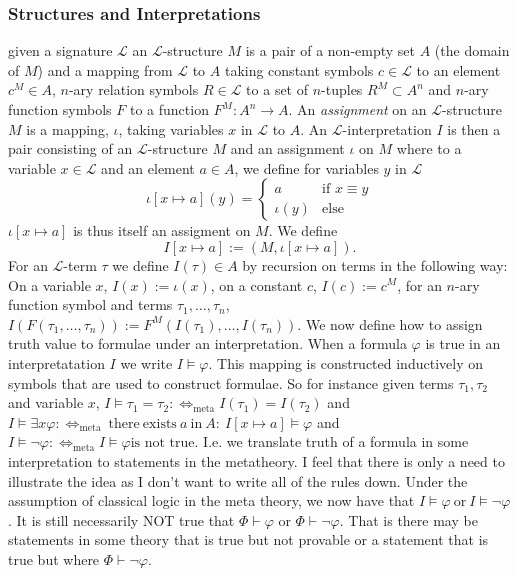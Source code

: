 \subsubsection{Structures and Interpretations}
given a signature $\mathcal{L}$ an $\mathcal{L}$-structure $M$ is a pair of a non-empty set $A$ (the domain of $M$) and a mapping from $\mathcal{L}$ to $A$ taking constant symbols $c\in \mathcal{L}$ to an element $c^M\in A$, $n$-ary relation symbols $R\in \mathcal{L}$ to a set of $n$-tuples $R^M\subset A^n$ and $n$-ary function symbols $F$ to a function $F^M: A^n \rightarrow A$. An \emph{assignment} on an $\mathcal{L}$-structure $M$ is a mapping, $\iota$, taking variables $x$ in $\mathcal{L}$ to $A$. An $\mathcal{L}$-interpretation $I$ is then a pair consisting of an $\mathcal{L}$-structure $M$ and an assignment $\iota$ on $M$ where to a variable $x\in \mathcal{L}$ and an element $a\in A$, we define for variables $y$ in $\mathcal{L}$
$$
    \iota[x\mapsto a] (y)=
    \begin{cases}
        a & \text{if } x\equiv y\\
        \iota(y) & \text{else}
    \end{cases}
$$
$\iota[x\mapsto a]$ is thus itself an assigment on $M$. We define 
$$I[x\mapsto a] := (M,\iota[x\mapsto a]).$$
For an $\mathcal{L}$-term $\tau$ we define $I(\tau)\in A$ by recursion on terms in the following way: On a variable $x$, $I(x):=\iota(x)$, on a constant $c$, $I(c):= c^M$, for an $n$-ary function symbol and terms $\tau_1,\dots,\tau_n$, $I(F(\tau_1,\dots,\tau_n)):= F^M(I(\tau_1),\dots,I(\tau_n)).$ We now define how to assign truth value to formulae under an interpretation. When a formula $\varphi$ is true in an interpretatation $I$ we write $I\vDash \varphi$. This mapping is constructed inductively on symbols that are used to construct formulae. So for instance given terms $\tau_1,\tau_2$ and variable $x$, $I\vDash \tau_1=\tau_2 :\iff_{\mathrm{meta}} I(\tau_1) = I(\tau_2)$ and $I\vDash \exists x \varphi: \iff_{\mathrm{meta}}\ \mathrm{there}\ \mathrm{exists}\ a\ \mathrm{in}\ A: \ I[x\mapsto a]\vDash \varphi$ and $I\vDash \neg\varphi :\iff_{\mathrm{meta}} I\vDash \varphi \text{is not true}$. I.e. we translate truth of a formula in some interpretation to statements in the metatheory. I feel that there is only a need to illustrate the idea as I don't want to write all of the rules down. Under the assumption of classical logic in the meta theory, we now have that $I \vDash \varphi \ \mathrm{or} \ I\vDash \neg \varphi$. It is still necessarily NOT true that $\Phi \vdash \varphi$ or $\Phi \vdash \neg\varphi$. That is there may be statements in some theory that is true but not provable or a statement that is true but where $\Phi \vdash \neg\varphi$.\\
